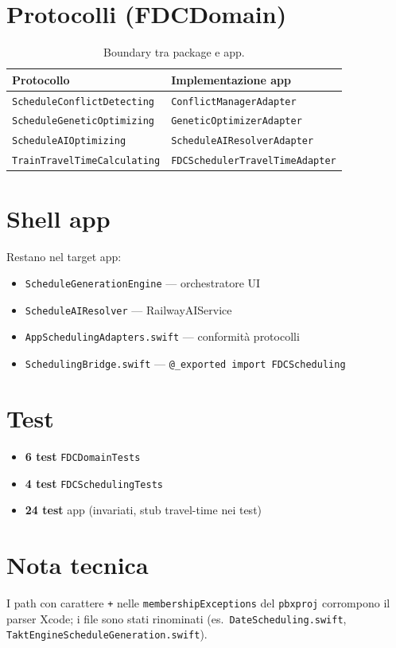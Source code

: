 \section{Protocolli (FDCDomain)}

\begin{table}[htbp]
\centering
\caption{Boundary tra package e app.}
\begin{tabularx}{\textwidth}{lX}
  \toprule
  \textbf{Protocollo} & \textbf{Implementazione app} \\
  \midrule
  \texttt{ScheduleConflictDetecting} & \texttt{ConflictManagerAdapter} \\
  \texttt{ScheduleGeneticOptimizing} & \texttt{GeneticOptimizerAdapter} \\
  \texttt{ScheduleAIOptimizing} & \texttt{ScheduleAIResolverAdapter} \\
  \texttt{TrainTravelTimeCalculating} & \texttt{FDCSchedulerTravelTimeAdapter} \\
  \bottomrule
\end{tabularx}
\end{table}

\section{Shell app}

Restano nel target app:

\begin{itemize}
  \item \texttt{ScheduleGenerationEngine} --- orchestratore UI
  \item \texttt{ScheduleAIResolver} --- RailwayAIService
  \item \texttt{AppSchedulingAdapters.swift} --- conformità protocolli
  \item \texttt{SchedulingBridge.swift} --- \texttt{@\_exported import FDCScheduling}
\end{itemize}

\section{Test}

\begin{itemize}
  \item \textbf{6 test} \texttt{FDCDomainTests}
  \item \textbf{4 test} \texttt{FDCSchedulingTests}
  \item \textbf{24 test} app (invariati, stub travel-time nei test)
\end{itemize}

\section{Nota tecnica}

I path con carattere \texttt{+} nelle \texttt{membershipExceptions} del
\texttt{pbxproj} corrompono il parser Xcode; i file sono stati rinominati
(es.\ \texttt{DateScheduling.swift}, \texttt{TaktEngineScheduleGeneration.swift}).

